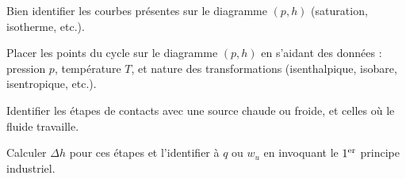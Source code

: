 \documentclass[12pt,fancy]{cours}
\begin{document}
\begin{methode}
  \item Bien identifier les courbes présentes sur le diagramme $(p,h)$ (saturation, isotherme, etc.).
  \item Placer les points du cycle sur le diagramme $(p,h)$ en s'aidant des données : pression $p$, température $T$, et nature des transformations (isenthalpique, isobare, isentropique, etc.).
  \item Identifier les étapes de contacts avec une source chaude ou froide, et celles où le fluide travaille.
  \item Calculer $\Delta h $ pour ces étapes et l'identifier à $q$ ou $w_u$ en invoquant le
  $1^{\rm er}$ principe industriel.
\end{methode}
\end{document}
